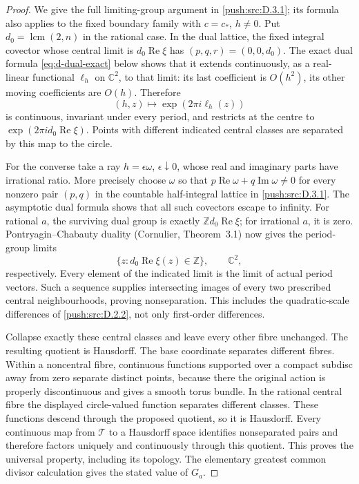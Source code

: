 \begin{proof}
We give the full limiting-group argument in \ref{push:src:D.3.1}; its formula also
applies to the fixed boundary family with \(c=c_*\), \(h\ne0\).
Put \(d_0=\operatorname{lcm}(2,n)\) in the rational case. In the dual
lattice, the fixed integral covector whose central limit is
\(d_0\operatorname{Re}\xi\) has
\((p,q,r)=(0,0,d_0)\). The exact dual formula
\eqref{eq:d-dual-exact} below shows that it extends continuously, as a
real-linear functional \(\ell_h\) on \(\mathbb C^2\), to that limit:
its last coefficient is \(O(h^2)\), its other moving coefficients
are \(O(h)\). Therefore
\[
 (h,z)\longmapsto\exp(2\pi i\ell_h(z))
\]
is continuous, invariant under every period, and restricts at the
centre to \(\exp(2\pi i d_0\operatorname{Re}\xi)\).
Points with different indicated central classes are separated by this
map to the circle.

For the converse take a ray \(h=\epsilon\omega\),
\(\epsilon\downarrow0\), whose real and imaginary parts have
irrational ratio. More precisely choose \(\omega\) so that
\(p\operatorname{Re}\omega+q\operatorname{Im}\omega\ne0\)
for every nonzero pair \((p,q)\) in the countable half-integral
lattice in \ref{push:src:D.3.1}. The asymptotic dual formula shows that all such
covectors escape to infinity. For rational \(a\), the surviving dual
group is exactly \(\mathbb Z d_0\operatorname{Re}\xi\); for
irrational \(a\), it is zero. Pontryagin--Chabauty duality
(Cornulier, Theorem~3.1) now gives the period-group limits
\[
 \{z:d_0\operatorname{Re}\xi(z)\in\mathbb Z\},\qquad
 \mathbb C^2,
\]
respectively. Every element of the indicated limit is the limit of
actual period vectors. Such a sequence supplies intersecting images
of every two prescribed central neighbourhoods, proving
nonseparation. This includes the quadratic-scale differences of
\ref{push:src:D.2.2}, not only first-order differences.

Collapse exactly these central classes and leave every other fibre
unchanged. The resulting quotient is Hausdorff. The base coordinate
separates different fibres. Within a noncentral fibre, continuous
functions supported over a compact subdisc away from zero separate
distinct points, because there the original action is properly
discontinuous and gives a smooth torus bundle. In the rational central
fibre the displayed circle-valued function separates different
classes. These functions descend through the proposed quotient, so
it is Hausdorff. Every continuous map from \(\mathcal T\) to a
Hausdorff space identifies nonseparated pairs and therefore factors
uniquely and continuously through this quotient. This proves the
universal property, including its topology. The elementary greatest
common divisor calculation gives the stated value of \(G_a\).
\end{proof}

